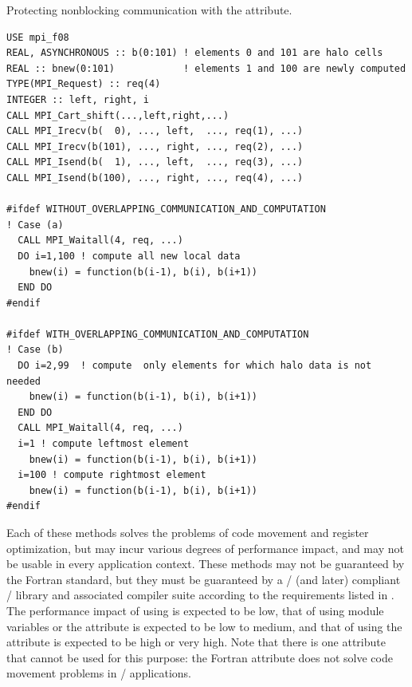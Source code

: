\begin{example}
Protecting nonblocking communication with the  attribute.
\label{exa:lang:async}
%
\begin{lstlisting}[language={[MPI08dirs]Fortran}]
USE mpi_f08
REAL, ASYNCHRONOUS :: b(0:101) ! elements 0 and 101 are halo cells
REAL :: bnew(0:101)            ! elements 1 and 100 are newly computed
TYPE(MPI_Request) :: req(4)
INTEGER :: left, right, i
CALL MPI_Cart_shift(...,left,right,...)
CALL MPI_Irecv(b(  0), ..., left,  ..., req(1), ...)
CALL MPI_Irecv(b(101), ..., right, ..., req(2), ...)
CALL MPI_Isend(b(  1), ..., left,  ..., req(3), ...)
CALL MPI_Isend(b(100), ..., right, ..., req(4), ...)

#ifdef WITHOUT_OVERLAPPING_COMMUNICATION_AND_COMPUTATION
! Case (a)
  CALL MPI_Waitall(4, req, ...)
  DO i=1,100 ! compute all new local data
    bnew(i) = function(b(i-1), b(i), b(i+1))
  END DO
#endif

#ifdef WITH_OVERLAPPING_COMMUNICATION_AND_COMPUTATION
! Case (b)
  DO i=2,99  ! compute  only elements for which halo data is not needed
    bnew(i) = function(b(i-1), b(i), b(i+1))
  END DO
  CALL MPI_Waitall(4, req, ...)
  i=1 ! compute leftmost element
    bnew(i) = function(b(i-1), b(i), b(i+1))
  i=100 ! compute rightmost element
    bnew(i) = function(b(i-1), b(i), b(i+1))
#endif
\end{lstlisting}
\end{example}

Each of these methods solves the problems of code movement and register optimization,
but may incur various degrees of performance impact,
and may not be usable in every application context.
These methods may not be guaranteed by the Fortran standard,
but they must be guaranteed by a \MPIIIIDOTO/ (and later) compliant
\MPI/ library and associated compiler
suite according to the requirements
listed in .
The performance impact of using  is
expected to be low, that of using module variables or the
 attribute is expected to be low to medium, and
that of using the  attribute is expected to be high or
very high.
Note that there is one attribute that cannot be used for this purpose:
the Fortran  attribute does not solve
code movement problems in \MPI/ applications.

